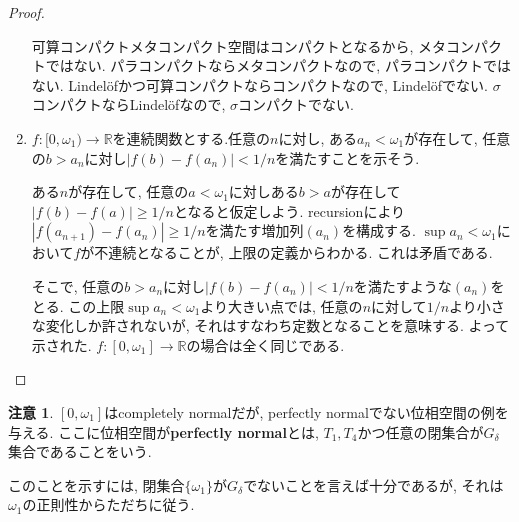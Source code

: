 \documentclass[a4paper, twoside]{bxjsarticle}
\newcommand{\rea}{\mathbb{R}}
\newcommand{\abs}[1]{\left\lvert#1\right\rvert}
\theoremstyle{definition}
\newtheorem{rem}[thm]{注意}
\begin{document}
\begin{proof}
\begin{enumerate}
                可算コンパクトメタコンパクト空間はコンパクトとなるから, メタコンパクトではない. パラコンパクトならメタコンパクトなので, パラコンパクトではない. Lindelöfかつ可算コンパクトならコンパクトなので, Lindelöfでない. $\sigma$コンパクトならLindelöfなので, $\sigma$コンパクトでない.
                
                \item $f\colon [0, \omega_1)\to\rea$を連続関数とする.任意の$n$に対し, ある$a_n<\omega_1$が存在して, 任意の$b>a_n$に対し$\abs{f(b)-f(a_n)}<1/n$を満たすことを示そう.
                
                ある$n$が存在して, 任意の$a<\omega_1$に対しある$b>a$が存在して$\abs{f(b)-f(a)}\geq1/n$となると仮定しよう. recursionにより$\abs{f(a_{n+1})-f(a_n)}\geq1/n$を満たす増加列$(a_n)$を構成する. $\sup a_n<\omega_1$において$f$が不連続となることが, 上限の定義からわかる. これは矛盾である.
                
                そこで, 任意の$b>a_n$に対し$\abs{f(b)-f(a_n)}<1/n$を満たすような$(a_n)$をとる. この上限$\sup a_n<\omega_1$より大きい点では, 任意の$n$に対して$1/n$より小さな変化しか許されないが, それはすなわち定数となることを意味する. よって示された. $f\colon [0, \omega_1]\to\rea$の場合は全く同じである.
            \end{enumerate}
        \end{proof}
        \begin{rem}
            $[0, \omega_1]$はcompletely normalだが, perfectly normalでない位相空間の例を与える. ここに位相空間が\textbf{perfectly normal}とは, $T_1, T_4$かつ任意の閉集合が$G_\delta$集合であることをいう.
            
            このことを示すには, 閉集合$\{\omega_1\}$が$G_\delta$でないことを言えば十分であるが, それは$\omega_1$の正則性からただちに従う.
        \end{rem}
\end{document}
